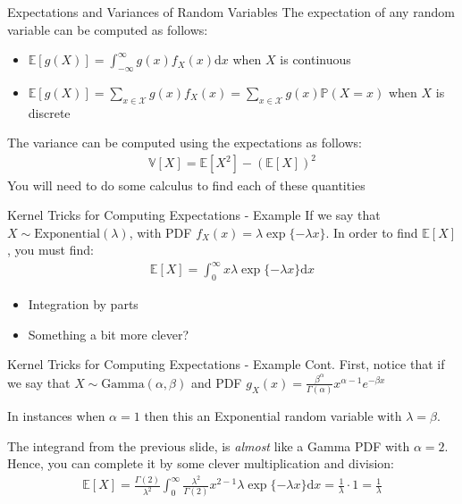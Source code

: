 \documentclass{beamer}
\begin{document}
\begin{frame}{Expectations and Variances of Random Variables}
The expectation of any random variable can be computed as follows:
\begin{itemize}
\item{$\mathbb{E}[g(X)] = \int_{-\infty}^{\infty}g(x)f_{X}(x) \mathrm{d}x$ when $X$ is continuous}
\item{$\mathbb{E}[g(X)] = \sum_{x\in\mathcal{X}}g(x)f_{X}(x) = \sum_{x\in\mathcal{X}}g(x)\mathbb{P}(X = x)$ when $X$ is discrete}
\end{itemize}
The variance can be computed using the expectations as follows:
\begin{align*}
\mathbb{V}[X]  = \mathbb{E}[X^{2}] - (\mathbb{E}[X])^{2}
\end{align*}
You will need to do some calculus to find each of these quantities
\end{frame}

\begin{frame}{Kernel Tricks for Computing Expectations - Example}
If we say that $X\sim\mathrm{Exponential}(\lambda)$, with PDF $f_{X}(x) = \lambda\exp\{-\lambda x\}$. In order to find $\mathbb{E}[X]$, you must find:
\begin{align*}
\mathbb{E}[X] = \int_{0}^{\infty} x\lambda\exp\{-\lambda x\} \mathrm{d}x
\end{align*}
\begin{itemize}
\item{Integration by parts}
\item{Something a bit more clever?}
\end{itemize}
\end{frame}

\begin{frame}{Kernel Tricks for Computing Expectations - Example Cont.}
First, notice that if we say that $X\sim\mathrm{Gamma}(\alpha, \beta)$ and PDF $g_{X}(x) = \frac{\beta^{\alpha}}{\Gamma(\alpha)} x^{\alpha - 1} e^{-\beta x}$
\newline

In instances when $\alpha = 1$ then this an Exponential random variable with $\lambda = \beta$. 
\newline 

The integrand from the previous slide, is \emph{almost} like a Gamma PDF with $\alpha = 2$. Hence, you can complete it by some clever multiplication and division:
\begin{align*}
\mathbb{E}[X] = \frac{\Gamma(2)}{\lambda^{2}}\int_{0}^{\infty}\frac{\lambda^{2}}{\Gamma(2)} x^{2-1}\lambda\exp\{-\lambda x\} \mathrm{d}x = \frac{1}{\lambda} \cdot 1 = \frac{1}{\lambda}
\end{align*}
\end{frame}
\end{document}
